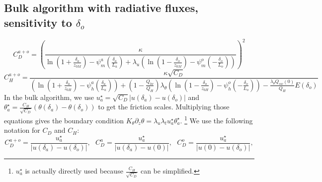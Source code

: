 \subsection{Bulk algorithm with radiative fluxes, sensitivity to
	$\delta_o$}
\label{sec:bulkRadiativeFluxes}
\begin{equation}
	C_D^{a+o} = \left(\frac{\kappa} {
		\ln(1 + \frac{\delta_a}{z_{0M}}) -
		\psi_m^a(\frac{\delta_a}{L_a})
		+ \lambda_u \left(
		\ln(1 - \frac{\delta_o}{z_{0M}}) -
		\psi_m^o(-\frac{\delta_o}{L_o})
		\right)
	} \right)^2
\end{equation}
\begin{equation}
	C_H^{a+o} = \frac{\kappa \sqrt{C_D}} {
		\left(
			\ln(1 + \frac{\delta_a}{z_{0H}}) -
			\psi_h^a(\frac{\delta_a}{L_a})
		\right)
		+
		(1 - \frac{Q_{lw}}
		{Q_H})
		\lambda_\theta \left(
			\ln(1 - \frac{\delta_o}{z_{0H}}) -
			\psi_h^o(-\frac{\delta_o}{L_o})
		\right)
		- \frac{\lambda_\theta Q_{sw}(0)}
		{Q_H} E(\delta_o)
	}
\end{equation}
In the bulk algorithm, we use $u_a^\star = \sqrt{C_D} |u(\delta_a)-
u(\delta_o)|$ and
$\theta_a^\star = \frac{C_H}{\sqrt{C_D}}(\theta(\delta_a)-
\theta(\delta_o))$ to get the friction scales.
Multiplying those equations gives the boundary condition
$K_\theta \partial_z \theta = \lambda_u \lambda_t u_a^\star \theta_a^\star$.
\footnote{
$u_a^\star$ is actually directly used because $\frac{C_H}{\sqrt{C_D}}$
can be simplified.
}
We use the following notation for $C_D$ and $C_H$:
\begin{equation}
	C_D^{a+o} = \frac{u_a^\star}{|u(\delta_a) - u(\delta_o)|},
	~~~
	C_D^{a} = \frac{u_a^\star}{|u(\delta_a) - u(0)|},
	~~~
	C_D^{o} = \frac{u_a^\star}{|u(0) - u(\delta_o)|},
\end{equation}
